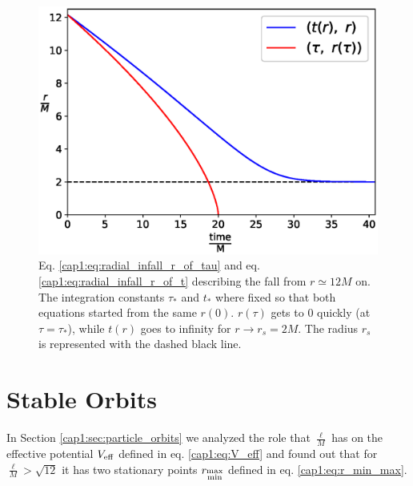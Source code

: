\begin{figure}[h]
    \centering
    \includegraphics[width = 0.8 \textwidth]{Figures/chapter1/radial_infall.eps}
    \caption{Eq. \ref{cap1:eq:radial_infall_r_of_tau} and eq.
    \ref{cap1:eq:radial_infall_r_of_t} describing the fall from
    $r \simeq 12M$ on.
    The integration constants $\tau_*$ and $t_*$ where fixed so that both
    equations started from the same $r(0)$.
    $r(\tau)$ gets to 0 quickly (at $\tau = \tau_*$), while $t(r)$ goes to
    infinity for $r \rightarrow r_s = 2M$. The \Sh radius $r_s$ is represented
    with the dashed black line.}
    \label{cap1:fig:radial_infall}

\end{figure}

\newpage


\section{Stable Orbits}
\label{cap1:sec:stable_orbits}

In Section \ref{cap1:sec:particle_orbits} we analyzed the role that
$\frac{\ell}{M}$ has on the effective potential $V_{\rm eff}$ defined in eq.
\ref{cap1:eq:V_eff} and found out that for $\frac{\ell}{M} > \sqrt{12}$ it has
two stationary points $r_{\substack{\rm max \\ \rm min}}$ defined in eq.
\ref{cap1:eq:r_min_max}.

